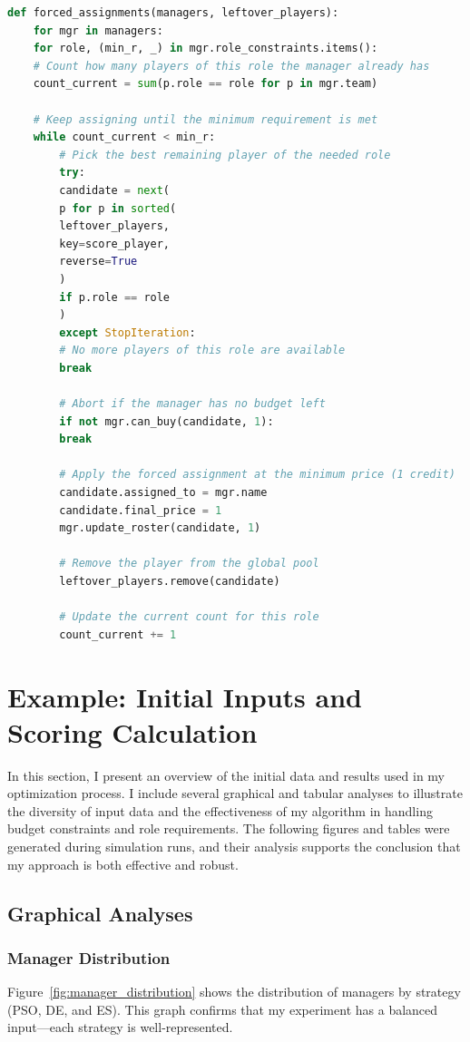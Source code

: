 \documentclass[sigconf]{acmart}
\begin{document}
	\begin{lstlisting}[language=Python, caption=Simple forced assignment to fill leftover roles]
def forced_assignments(managers, leftover_players):
	for mgr in managers:
	for role, (min_r, _) in mgr.role_constraints.items():
	# Count how many players of this role the manager already has
	count_current = sum(p.role == role for p in mgr.team)
	
	# Keep assigning until the minimum requirement is met
	while count_current < min_r:
		# Pick the best remaining player of the needed role
		try:
		candidate = next(
		p for p in sorted(
		leftover_players,       
		key=score_player,        
		reverse=True
		)
		if p.role == role
		)
		except StopIteration:
		# No more players of this role are available
		break
		
		# Abort if the manager has no budget left
		if not mgr.can_buy(candidate, 1):
		break
		
		# Apply the forced assignment at the minimum price (1 credit)
		candidate.assigned_to = mgr.name
		candidate.final_price = 1
		mgr.update_roster(candidate, 1)
		
		# Remove the player from the global pool
		leftover_players.remove(candidate)
		
		# Update the current count for this role
		count_current += 1

	\end{lstlisting}
	
\section{Example: Initial Inputs and Scoring Calculation}
\label{sec:results}
In this section, I present an overview of the initial data and results used in my optimization process. I include several graphical and tabular analyses to illustrate the diversity of input data and the effectiveness of my algorithm in handling budget constraints and role requirements. The following figures and tables were generated during simulation runs, and their analysis supports the conclusion that my approach is both effective and robust.

\subsection{Graphical Analyses}

\subsubsection{Manager Distribution}
Figure~\ref{fig:manager_distribution} shows the distribution of managers by strategy (PSO, DE, and ES). This graph confirms that my experiment has a balanced input—each strategy is well-represented. 
\end{document}
